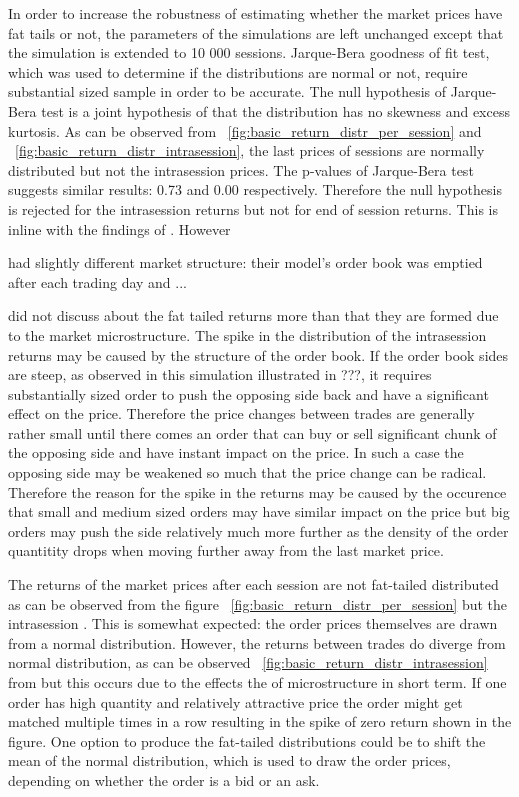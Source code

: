 In order to increase the robustness of estimating whether the market prices have fat tails or not, the parameters of the
simulations are left unchanged except that the simulation is extended to 10 000 sessions. Jarque-Bera goodness of fit test,
which was used to determine if the distributions are normal or not, require substantial sized sample in order to be accurate.
The null hypothesis of Jarque-Bera test is a joint hypothesis of that the distribution has no skewness and excess kurtosis. 
As can be observed from ~\ref{fig:basic_return_distr_per_session} and ~\ref{fig:basic_return_distr_intrasession}, the last 
prices of sessions are normally distributed but not the intrasession prices. The p-values of Jarque-Bera test suggests similar
results: 0.73 and 0.00 respectively. Therefore the null hypothesis is rejected for the intrasession returns but not for
end of session returns. This is inline with the findings of \citet{Raberto05}. However \author{Raberto05} had slightly
different market structure: their model's order book was emptied after each trading day and ...
\author{Raberto05} did not discuss about the fat tailed returns more than that they are formed due to the market microstructure.
The spike in the distribution of the intrasession returns may be caused by the structure of the order book. If the order book 
sides are steep, as observed in this simulation illustrated in ???, it requires substantially sized order to push the opposing 
side back and have a significant effect on the price. Therefore the price changes between trades are generally rather small
until there comes an order that can buy or sell significant chunk of the opposing side and have instant impact on the price. 
In such a case the opposing side may be weakened so much that the price change can be radical. Therefore the reason for the
spike in the returns may be caused by the occurence that small and medium sized orders may have similar impact on the price
but big orders may push the side relatively much more further as the density of the order quantitity drops when moving further
away from the last market price.


The returns of the market prices after each session are not fat-tailed distributed as can be observed from the figure 
~\ref{fig:basic_return_distr_per_session} but the intrasession . This is somewhat expected: the order prices themselves are drawn from a normal distribution.
However, the returns between trades do diverge from normal distribution, as can be observed ~\ref{fig:basic_return_distr_intrasession} 
from  but this occurs due to the effects the of microstructure in short term. If one order has high quantity and 
relatively attractive price the order might get matched multiple times in a row resulting in the spike of zero return 
shown in the figure. One option to produce the fat-tailed distributions could be to shift the mean of the normal distribution, 
which is used to draw the order prices, depending on whether the order is a bid or an ask. 




